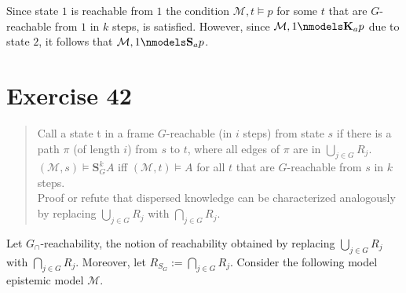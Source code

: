 \documentclass[11pt,a4paper]{article}
\newcommand{\eall}{\mathbf{K}}
\newcommand{\edisp}{\mathbf{S}}
\begin{document}
\begin{center}
\end{center}

Since state $1$ is reachable from $1$ the condition $\mathcal{M},t \models p$ for some $t$ that are $G$-reachable from $1$ in $k$ steps, is satisfied. However, since $\mathcal{M},1 \nmodels \eall_a p$ due to state $2$, it follows that $\mathcal{M},1 \nmodels \edisp_a p$.


\section*{Exercise 42}
\begin{quote}
Call a state t in a frame $G$-reachable (in $i$ steps) from state $s$ if there is a path $\pi$ (of length $i$) from $s$ to $t$, where all edges of $\pi$ are in $\bigcup_{j \in G} R_j$. \\

$(\mathcal{M},s) \models \edisp_G^k A$ iff $(\mathcal{M},t) \models A$ for all $t$ that are $G$-reachable from $s$ in $k$ steps.\\

Proof or refute that dispersed knowledge can be characterized analogously by replacing $\bigcup_{j \in G}R_j $ with $\bigcap_{j \in G} R_j$.
\end{quote}

Let $G_{\cap}$-reachability, the notion of reachability obtained by replacing $\bigcup_{j \in G}R_j $ with $\bigcap_{j \in G} R_j$. Moreover, let $R_{S_G} := \bigcap_{j \in G} R_j$.
Consider the following model epistemic model $\mathcal{M}$.

\begin{center}
\end{center}
\end{document}
